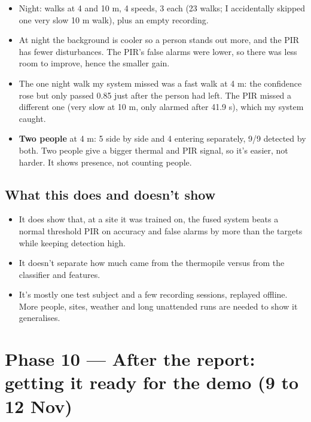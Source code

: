 \documentclass[11pt,a4paper]{article}
\providecommand{\tightlist}{\setlength{\itemsep}{0pt}\setlength{\parskip}{0pt}}
\begin{document}
\begin{itemize}
\tightlist
\item
  Night: walks at 4 and 10 m,
  4 speeds, 3 each (23 walks;
  I accidentally skipped one
  very slow 10 m walk), plus
  an empty recording.
\item
  At night the background is
  cooler so a person stands
  out more, and the PIR has
  fewer disturbances. The
  PIR's false alarms were
  lower, so there was less
  room to improve, hence the
  smaller gain.
\item
  The one night walk my system
  missed was a fast walk at 4
  m: the confidence rose but
  only passed 0.85 just after
  the person had left. The PIR
  missed a different one (very
  slow at 10 m, only alarmed
  after 41.9 s), which my
  system caught.
\item
  \textbf{Two people} at 4 m:
  5 side by side and 4
  entering separately, 9/9
  detected by both. Two people
  give a bigger thermal and
  PIR signal, so it's easier,
  not harder. It shows
  presence, not counting
  people.
\end{itemize}

\hypertarget{what-this-does-and-doesnt-show}{%
\subsection{What this does and
doesn't
show}\label{what-this-does-and-doesnt-show}}

\begin{itemize}
\tightlist
\item
  It does show that, at a site
  it was trained on, the fused
  system beats a normal
  threshold PIR on accuracy
  and false alarms by more
  than the targets while
  keeping detection high.
\item
  It doesn't separate how much
  came from the thermopile
  versus from the classifier
  and features.
\item
  It's mostly one test subject
  and a few recording
  sessions, replayed offline.
  More people, sites, weather
  and long unattended runs are
  needed to show it
  generalises.
\end{itemize}

\hypertarget{phase-10-after-the-report-getting-it-ready-for-the-demo-9-to-12-nov}{%
\section{Phase 10 --- After
the report: getting it ready
for the demo (9 to 12
Nov)}\label{phase-10-after-the-report-getting-it-ready-for-the-demo-9-to-12-nov}}
\end{document}
